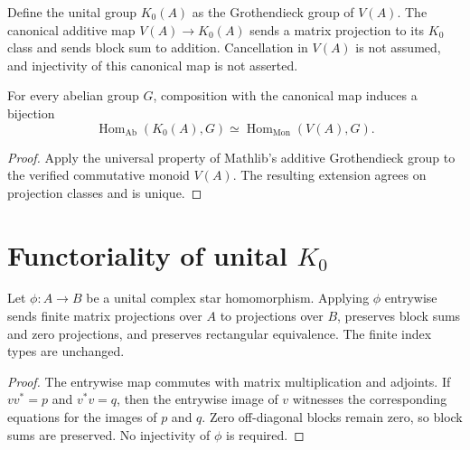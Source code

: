 \begin{definition}\label{def:operator-k0}
\leanok
Define the unital group $K_0(A)$ as the Grothendieck group of $V(A)$.
The canonical additive map $V(A)\to K_0(A)$ sends a matrix projection to
its $K_0$ class and sends block sum to addition.
Cancellation in $V(A)$ is not assumed, and injectivity of this canonical map
is not asserted.
\end{definition}

\begin{proposition}\label{prop:operator-k0-universal}
For every abelian group $G$, composition with the canonical map induces a
bijection
\[
 \operatorname{Hom}_{\mathrm{Ab}}(K_0(A),G)
 \simeq \operatorname{Hom}_{\mathrm{Mon}}(V(A),G).
\]
\end{proposition}
\begin{proof}
\leanok
Apply the universal property of Mathlib's additive Grothendieck group to
the verified commutative monoid $V(A)$. The resulting extension agrees on
projection classes and is unique.
\end{proof}

\section{Functoriality of unital $K_0$}

\begin{proposition}\label{prop:matrix-projection-map}
Let $\phi:A\to B$ be a unital complex star homomorphism. Applying $\phi$
entrywise sends finite matrix projections over $A$ to projections over $B$,
preserves block sums and zero projections, and preserves rectangular equivalence.
The finite index types are unchanged.
\end{proposition}
\begin{proof}
\leanok
The entrywise map commutes with matrix multiplication and adjoints.
If $vv^*=p$ and $v^*v=q$, then the entrywise image of $v$ witnesses the
corresponding equations for the images of $p$ and $q$. Zero off-diagonal
blocks remain zero, so block sums are preserved. No injectivity of $\phi$
is required.
\end{proof}

